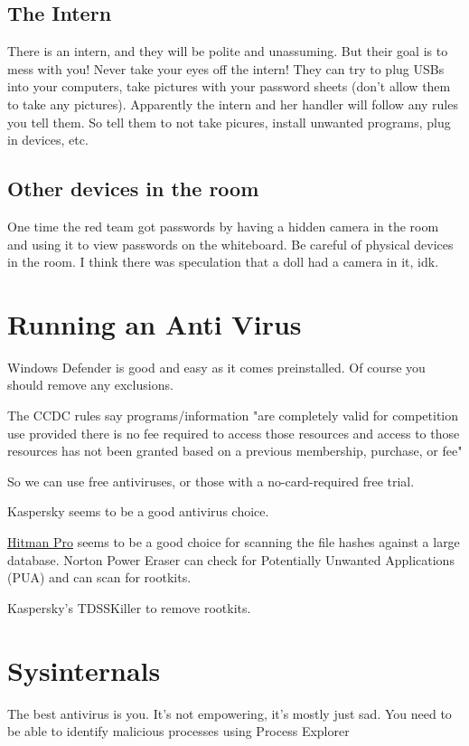\documentclass{article}
\begin{document}
\subsection{The Intern}
There is an intern, and they will be polite and unassuming. But their goal is to mess with you! Never take your eyes off the intern!
They can try to plug USBs into your computers, take pictures with your password sheets (don't allow them to take any pictures).
Apparently the intern and her handler will follow any rules you tell them. So tell them to not take picures, install unwanted programs, plug in devices, etc.

\subsection{Other devices in the room}
One time the red team got passwords by having a hidden camera in the room and using it to view passwords on the whiteboard. 
Be careful of physical devices in the room. I think there was speculation that a doll had a camera in it, idk.

\section{Running an Anti Virus}
Windows Defender is good and easy as it comes preinstalled. Of course you should remove any exclusions.

The CCDC rules say programs/information "are completely valid for competition use provided there is no 
fee required to access those resources and access to 
those resources has not been granted based on a previous membership, purchase, or fee"

So we can use free antiviruses, or those with a no-card-required free trial.

Kaspersky seems to be a good antivirus choice.

\href{https://www.sophos.com/en-us/free-tools/hitmanpro}{Hitman Pro}
seems to be a good choice for scanning the file hashes against a large database.
Norton Power Eraser can check for Potentially Unwanted Applications (PUA) and can scan for rootkits.

Kaspersky's TDSSKiller to remove rootkits.

\section{Sysinternals}
The best antivirus is you. It's not empowering, it's mostly just sad.
You need to be able to identify malicious processes using Process Explorer
\end{document}
